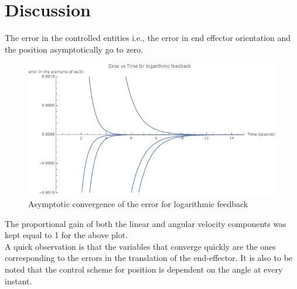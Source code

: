 \documentclass[a4paper,12pt]{article}
\begin{document}
\section{Discussion}
The error in the controlled entities i.e., the error in end effector orientation and the position asymptotically go to zero.
\begin{figure}[H]
	\centering
	\includegraphics[scale=0.7]{dqc_log_error}
	\caption{Asymptotic convergence of the error for logarithmic feedback}
	\label{fg:dqc_log_error}
\end{figure}
The proportional gain of both the linear and angular velocity components was kept equal to 1 for the above plot.\\
A quick observation is that the variables that converge quickly are the ones corresponding to the errors in the translation of the end-effector. It is also to be noted that the control scheme for position is dependent on the angle at every instant.
\end{document}
